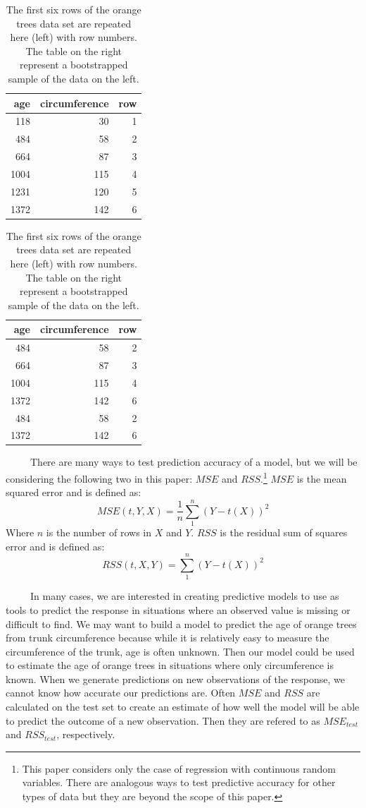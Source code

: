 \documentclass[12pt,twoside]{reedthesis}
\begin{document}
  \begin{table}
  \caption{\label{tab:unnamed-chunk-9}\label{tab:tabbootorange}The first six rows of the orange trees data set are repeated here (left) with row numbers. The table on the right represent a bootstrapped sample of the data on the left.}
  
  \centering
  \begin{tabular}[t]{rrr}
  \toprule
  age & circumference & row\\
  \midrule
  118 & 30 & 1\\
  484 & 58 & 2\\
  664 & 87 & 3\\
  1004 & 115 & 4\\
  1231 & 120 & 5\\
  1372 & 142 & 6\\
  \bottomrule
  \end{tabular}
  \centering
  \begin{tabular}[t]{rrr}
  \toprule
  age & circumference & row\\
  \midrule
  484 & 58 & 2\\
  664 & 87 & 3\\
  1004 & 115 & 4\\
  1372 & 142 & 6\\
  484 & 58 & 2\\
  1372 & 142 & 6\\
  \bottomrule
  \end{tabular}
  \end{table}
  
  ~~~~~There are many ways to test prediction accuracy of a model, but we
  will be considering the following two in this paper: \(MSE\) and
  \(RSS\).\footnote{This paper considers only the case of regression with
    continuous random variables. There are analogous ways to test
    predictive accuracy for other types of data but they are beyond the
    scope of this paper.} \(MSE\) is the mean squared error and is defined
  as: \[MSE(t,Y,X) = \frac{1}{n} \sum_1^n (Y - t(X))^2\] Where \(n\) is
  the number of rows in \(X\) and \(Y\). \(RSS\) is the residual sum of
  squares error and is defined as: \[RSS(t,X,Y) = \sum_1^n (Y - t(X))^2\]
  
  ~~~~~In many cases, we are interested in creating predictive models to
  use as tools to predict the response in situations where an observed
  value is missing or difficult to find. We may want to build a model to
  predict the age of orange trees from trunk circumference because while
  it is relatively easy to measure the circumference of the trunk, age is
  often unknown. Then our model could be used to estimate the age of
  orange trees in situations where only circumference is known. When we
  generate predictions on new observations of the response, we cannot know
  how accurate our predictions are. Often \(MSE\) and \(RSS\) are
  calculated on the test set to create an estimate of how well the model
  will be able to predict the outcome of a new observation. Then they are
  refered to as \(MSE_{test}\) and \(RSS_{test}\), respectively.
  
\end{document}
